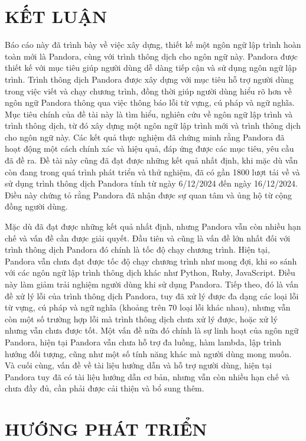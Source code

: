 \chapter*{KẾT LUẬN}

Báo cáo này đã trình bày về việc xây dựng, thiết kế một ngôn ngữ lập trình hoàn toàn mới là Pandora, cùng với trình thông dịch cho ngôn ngữ này. Pandora được thiết kế với mục tiêu giúp người dùng dễ dàng tiếp cận và sử dụng ngôn ngữ lập trình. Trình thông dịch Pandora được xây dựng với mục tiêu hỗ trợ người dùng trong việc viết và chạy chương trình, đồng thời giúp người dùng hiểu rõ hơn về ngôn ngữ Pandora thông qua việc thông báo lỗi từ vựng, cú pháp và ngữ nghĩa. Mục tiêu chính của đề tài này là tìm hiểu, nghiên cứu về ngôn ngữ lập trình và trình thông dịch, từ đó xây dựng một ngôn ngữ lập trình mới và trình thông dịch cho ngôn ngữ này. Các kết quả thực nghiệm đã chứng minh rằng Pandora đã hoạt động một cách chính xác và hiệu quả, đáp ứng được các mục tiêu, yêu cầu đã đề ra. Đề tài này cũng đã đạt được những kết quả nhất định, khi mặc dù vẫn còn đang trong quá trình phát triển và thử nghiệm, đã có gần 1800 lượt tải về và sử dụng trình thông dịch Pandora tính từ ngày 6/12/2024 đến ngày 16/12/2024. Điều này chứng tỏ rằng Pandora đã nhận được sự quan tâm và ủng hộ từ cộng đồng người dùng.

Mặc dù đã đạt được những kết quả nhất định, nhưng Pandora vẫn còn nhiều hạn chế và vấn đề cần được giải quyết. Đầu tiên và cũng là vấn đề lớn nhất đối với trình thông dịch Pandora đó chính là tốc độ chạy chương trình. Hiện tại, Pandora vẫn chưa đạt được tốc độ chạy chương trình như mong đợi, khi so sánh với các ngôn ngữ lập trình thông dịch khác như Python, Ruby, JavaScript. Điều này làm giảm trải nghiệm người dùng khi sử dụng Pandora. Tiếp theo, đó là vấn đề xử lý lỗi của trình thông dịch Pandora, tuy đã xử lý được đa dạng các loại lỗi từ vựng, cú pháp và ngữ nghĩa (khoảng trên 70 loại lỗi khác nhau), nhưng vẫn còn một số trường hợp lỗi mà trình thông dịch chưa xử lý được, hoặc xử lý nhưng vẫn chưa được tốt. Một vấn đề nữa đó chính là sự linh hoạt của ngôn ngữ Pandora, hiện tại Pandora vẫn chưa hỗ trợ đa luồng, hàm lambda, lập trình hướng đối tượng, cũng như một số tính năng khác mà người dùng mong muốn. Và cuối cùng, vấn đề về tài liệu hướng dẫn và hỗ trợ người dùng, hiện tại Pandora tuy đã có tài liệu hướng dẫn cơ bản, nhưng vẫn còn nhiều hạn chế và chưa đầy đủ, cần phải được cải thiện và bổ sung thêm.

\chapter*{HƯỚNG PHÁT TRIỂN} 


